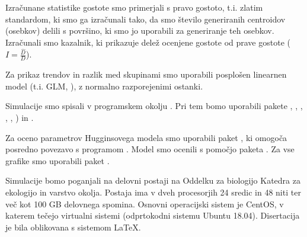 Izračunane statistike gostote smo primerjali s pravo gostoto, t.i. zlatim standardom, ki smo ga izračunali tako, da smo število generiranih centroidov (osebkov) delili s površino, ki smo jo uporabili za generiranje teh osebkov. Izračunali smo kazalnik, ki prikazuje delež ocenjene gostote od prave gostote ($I = \frac{\hat{D}}{D}$).

Za prikaz trendov in razlik med skupinami smo uporabili posplošen linearnen model (t.i. GLM, \citet{faraway_extending_2006}), z normalno razporejenimi ostanki.

Simulacije smo spisali v programskem okolju  \citep{r_core_team_r_2018}. Pri tem bomo uporabili pakete  \citep{bivand_applied_2008},  \citep{hijmans_ability_2006},  \citep{bivand_rundel_2017},  \citep{maechler_et_al_2018},  \citep{rowlingson_diggle_2017},  \citep{microsoft_2017}) in  \citep{doparallel_2017}.

Za oceno parametrov Hugginsovega modela smo uporabili paket  \citep{laake_2013}, ki omogoča posredno povezavo s programom  \citep{cooch_program_2012}. Model  smo ocenili s pomočjo  paketa  \citep{pennell_miller_2012}. Za vse grafike smo uporabili paket  \citep{wickham_ggplot2_2009}.

Simulacije bomo poganjali na delovni postaji na Oddelku za biologijo Katedra za ekologijo in varstvo okolja. Postaja ima v dveh procesorjih 24 sredic in 48 niti ter več kot 100 GB delovnega spomina. Osnovni operacijski sistem je CentOS, v katerem tečejo virtualni sistemi (odprtokodni sistemu Ubuntu 18.04). Disertacija je bila oblikovana s sistemom \LaTeX.
